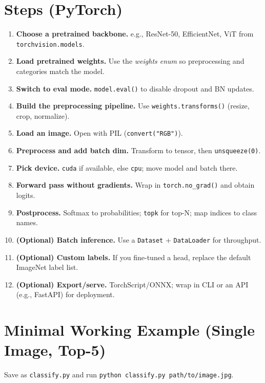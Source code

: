 \documentclass[11pt,a4paper]{article}
\begin{document}
\section*{Steps (PyTorch)}
\begin{enumerate}[leftmargin=1.3em]
  \item \textbf{Choose a pretrained backbone.} e.g., ResNet-50, EfficientNet, ViT from \texttt{torchvision.models}.
  \item \textbf{Load pretrained weights.} Use the \emph{weights enum} so preprocessing and categories match the model.
  \item \textbf{Switch to eval mode.} \verb|model.eval()| to disable dropout and BN updates.
  \item \textbf{Build the preprocessing pipeline.} Use \verb|weights.transforms()| (resize, crop, normalize).
  \item \textbf{Load an image.} Open with PIL (\verb|convert("RGB")|).
  \item \textbf{Preprocess and add batch dim.} Transform to tensor, then \verb|unsqueeze(0)|.
  \item \textbf{Pick device.} \verb|cuda| if available, else \verb|cpu|; move model and batch there.
  \item \textbf{Forward pass without gradients.} Wrap in \verb|torch.no_grad()| and obtain logits.
  \item \textbf{Postprocess.} Softmax to probabilities; \verb|topk| for top-N; map indices to class names.
  \item \textbf{(Optional) Batch inference.} Use a \verb|Dataset| + \verb|DataLoader| for throughput.
  \item \textbf{(Optional) Custom labels.} If you fine-tuned a head, replace the default ImageNet label list.
  \item \textbf{(Optional) Export/serve.} TorchScript/ONNX; wrap in CLI or an API (e.g., FastAPI) for deployment.
\end{enumerate}

\section*{Minimal Working Example (Single Image, Top-5)}
Save as \texttt{classify.py} and run \verb|python classify.py path/to/image.jpg|.
\end{document}
